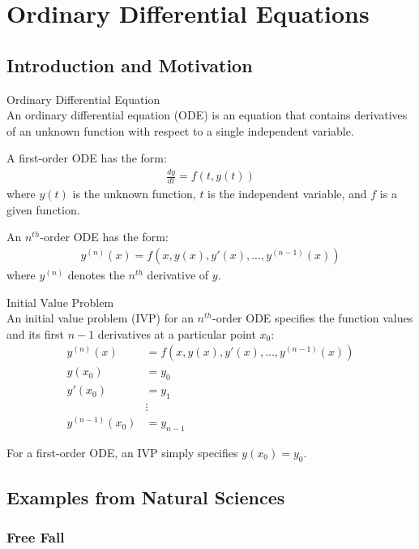 \section{Ordinary Differential Equations}

\subsection{Introduction and Motivation}

\begin{definition}{Ordinary Differential Equation}\\
An ordinary differential equation (ODE) is an equation that contains derivatives of an unknown function with respect to a single independent variable. 

A first-order ODE has the form:
\begin{align*}
\frac{dy}{dt} = f(t, y(t))
\end{align*}
where $y(t)$ is the unknown function, $t$ is the independent variable, and $f$ is a given function.

An $n^{th}$-order ODE has the form:
\begin{align*}
y^{(n)}(x) = f(x, y(x), y'(x), ..., y^{(n-1)}(x))
\end{align*}
where $y^{(n)}$ denotes the $n^{th}$ derivative of $y$.
\end{definition}

\begin{definition}{Initial Value Problem}\\
An initial value problem (IVP) for an $n^{th}$-order ODE specifies the function values and its first $n-1$ derivatives at a particular point $x_0$:
\begin{align*}
y^{(n)}(x) &= f(x, y(x), y'(x), ..., y^{(n-1)}(x))\\
y(x_0) &= y_0\\
y'(x_0) &= y_1\\
&\vdots\\
y^{(n-1)}(x_0) &= y_{n-1}
\end{align*}

For a first-order ODE, an IVP simply specifies $y(x_0) = y_0$.
\end{definition}

\subsection{Examples from Natural Sciences}

\subsubsection{Free Fall}

